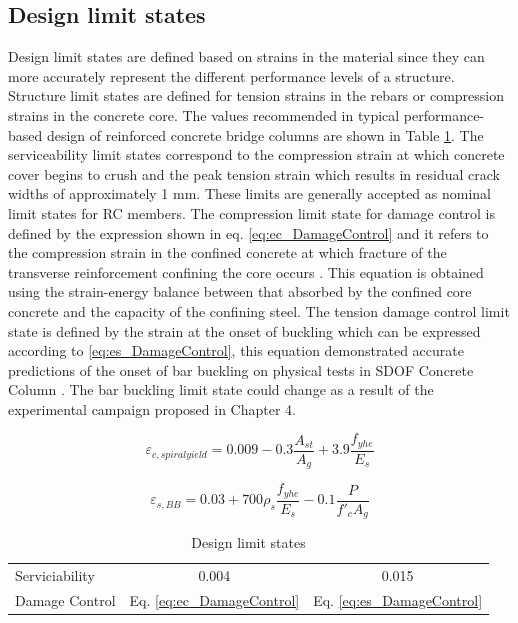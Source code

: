 \subsection{Design limit states}
Design limit states are defined based on strains in the material since they can more accurately represent the different performance levels of a structure. Structure limit states are defined for tension strains in the rebars or compression strains in the concrete core. The values recommended in typical performance-based design of reinforced concrete bridge columns are shown in Table  \ref{tab:DesignLimitStates}. The serviceability limit states correspond to the compression strain at which concrete cover begins to crush and the peak tension strain which results in residual crack widths of approximately 1 mm. These limits are generally accepted as nominal limit states for RC members. The compression limit state for damage control is defined by the expression shown in eq. \ref{eq:ec_DamageControl} and it refers to the compression strain in the confined concrete at which fracture of the transverse reinforcement confining the core occurs \cite{Priestley2007}. This equation is obtained using the strain-energy balance between that absorbed by the confined core concrete and the capacity of the confining steel. The tension damage control limit state is defined by the strain at the onset of buckling which can be expressed according to \ref{eq:es_DamageControl}, this equation demonstrated accurate predictions of the onset of bar buckling on physical tests in SDOF Concrete Column \cite{Goodnight2016}. The bar buckling limit state could change as a result of the experimental campaign proposed in Chapter 4.

\begin{equation}
    \varepsilon_{c,spiral yield}=0.009-0.3\frac{A_{st}}{A_{g}} +3.9\frac{f_{yhe}}{E_{s}}
    \label{eq:ec_DamageControl}
\end{equation}

\begin{equation}
    \varepsilon_{s,BB}=0.03+700\rho_{s}  \frac{f_{yhe}}{E_{s}} -0.1\frac{P}{f'_{c}A_{g}}
    \label{eq:es_DamageControl}
\end{equation}


\begin{table}[htbp]
	\caption{Design limit states}
	\label{tab:DesignLimitStates}
	\centering	
		\begin{tabular}{|l|c|c|}
		\hline
		\cellcolor[HTML]{CC0000}{\color[HTML]{FFFFFF}Limit State} & \cellcolor[HTML]{CC0000}{\color[HTML]{FFFFFF}Concrete Limit State $\varepsilon_{c} (in/in)$} & \cellcolor[HTML]{CC0000}{\color[HTML]{FFFFFF}Reinforcing Steel Limit State $\varepsilon_{s} (in/in)$}\\  \hline	
		Serviciability       & 0.004                           & 0.015  \\  \hline	
		Damage Control       & Eq. \ref{eq:ec_DamageControl}   & Eq. \ref{eq:es_DamageControl}\\  \hline
		\end{tabular}
\end{table}
 

